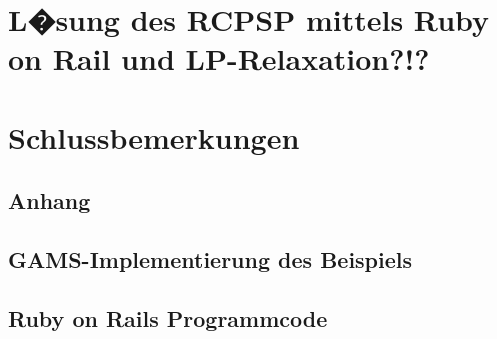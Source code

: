 \documentclass[a4paper,12pt,parskip,bibtotoc,liststotoc]{article}
\begin{document}
\section{L�sung des RCPSP mittels Ruby on Rail und LP-Relaxation?!?} \label{Grund}

\section{Schlussbemerkungen}

\newpage

\newpage
%
%
\begin{appendix}
\section{Anhang}

\subsection{GAMS-Implementierung des Beispiels}\label{Imp}

\subsection{Ruby on Rails Programmcode}\label{Anhang2}


\end{appendix}
\end{document}
